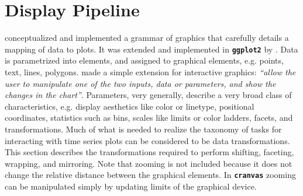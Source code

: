 \documentclass[12pt]{article}
\begin{document}



\section{Display Pipeline\label{sec:Pipeline}}

\citet{wilkinson2000language, wilkinson2001nvizn, wilkinson2006grammar}
conceptualized and implemented a grammar of graphics that
carefully details a mapping of data to plots. It was extended
and implemented in \texttt{\textbf{ggplot2}} by \citet{ggplot2}. Data is
parametrized into elements, and assigned to graphical elements,
e.g. points, text, lines, polygons. \citet{wills2012visualizing}
made a simple extension for interactive graphics: \textit{``allow
the user to manipulate one of the two inputs, data or parameters,
and show the changes in the chart''}. Parameters, very generally,
describe a very broad class of characteristics, e.g. display
aesthetics like color or linetype, positional coordinates,
statistics such as bins, scales like limits or color ladders,
facets, and transformations. Much of what is needed to realize
the taxonomy of tasks for interacting with time series plots
can be considered to be data transformations. This section
describes the transformations required to perform shifting,
faceting, wrapping, and mirroring. Note that zooming is not
included because it does not change the relative distance between
the graphical elements. In \texttt{\textbf{cranvas}} zooming can
be manipulated simply by updating limits of the graphical device.
\end{document}
